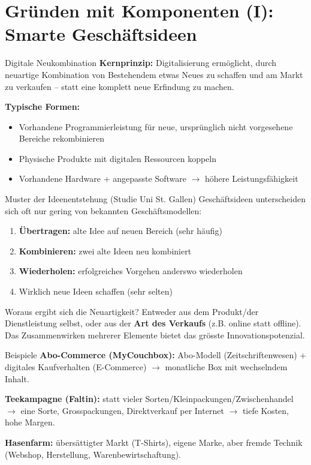 \documentclass[a4paper, fontsize=7pt]{scrartcl}
\begin{document}
\section{Gründen mit Komponenten (I): Smarte Geschäftsideen}

\begin{mainbox}{Digitale Neukombination}
\textbf{Kernprinzip:} Digitalisierung ermöglicht, durch neuartige Kombination von
Bestehendem etwas Neues zu schaffen und am Markt zu verkaufen -- statt eine
komplett neue Erfindung zu machen.

\textbf{Typische Formen:}
\begin{itemize}
    \item Vorhandene Programmierleistung für neue, ursprünglich nicht vorgesehene
    Bereiche rekombinieren
    \item Physische Produkte mit digitalen Ressourcen koppeln
    \item Vorhandene Hardware + angepasste Software $\to$ höhere Leistungsfähigkeit
\end{itemize}
\end{mainbox}

\begin{mainbox}{Muster der Ideenentstehung (Studie Uni St. Gallen)}
Geschäftsideen unterscheiden sich oft nur gering von bekannten Geschäftsmodellen:
\begin{enumerate}
    \item \textbf{Übertragen:} alte Idee auf neuen Bereich (sehr häufig)
    \item \textbf{Kombinieren:} zwei alte Ideen neu kombiniert
    \item \textbf{Wiederholen:} erfolgreiches Vorgehen anderswo wiederholen
    \item Wirklich neue Ideen schaffen (sehr selten)
\end{enumerate}
\end{mainbox}

\begin{subbox}{Woraus ergibt sich die Neuartigkeit?}
Entweder aus dem Produkt/der Dienstleistung selbst, oder aus der \textbf{Art des
Verkaufs} (z.B. online statt offline). Das Zusammenwirken mehrerer Elemente
bietet das grösste Innovationspotenzial.
\end{subbox}

\begin{subbox}{Beispiele}
\textbf{Abo-Commerce (MyCouchbox):} Abo-Modell (Zeitschriftenwesen) + digitales
Kaufverhalten (E-Commerce) $\to$ monatliche Box mit wechselndem Inhalt.

\textbf{Teekampagne (Faltin):} statt vieler Sorten/Kleinpackungen/Zwischenhandel
$\to$ eine Sorte, Grosspackungen, Direktverkauf per Internet $\to$ tiefe Kosten,
hohe Margen.

\textbf{Hasenfarm:} übersättigter Markt (T-Shirts), eigene Marke, aber fremde
Technik (Webshop, Herstellung, Warenbewirtschaftung).
\end{subbox}
\end{document}
